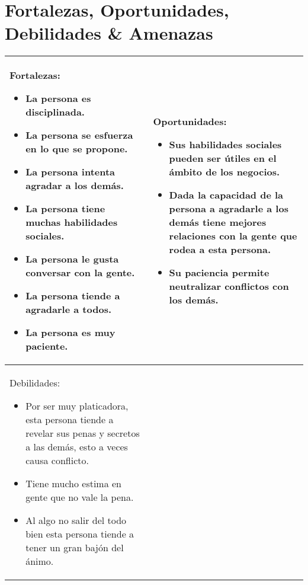 \documentclass{article}
\begin{document}
\maketitle


\section{Fortalezas, Oportunidades, Debilidades \& Amenazas}
\begin{center}
   \begin{tabular}{ | p{8.5cm} | p{8.5cm} | }
       \hline
            Fortalezas: 
                \begin{itemize}
                    \item La persona es disciplinada.
                    \item La persona se esfuerza en lo que se propone.
                    \item La persona intenta agradar a los demás.
                    \item La persona tiene muchas habilidades sociales.
                    \item La persona le gusta conversar con la gente.
                    \item La persona tiende a agradarle a todos.
                    \item La persona es muy paciente.
                \end{itemize}

            & Oportunidades: 
                \begin{itemize}
                    \item Sus habilidades sociales pueden ser útiles en el ámbito de los negocios.
                    \item Dada la capacidad de la persona a agradarle a los demás tiene mejores relaciones con la gente que rodea a esta persona.
                    \item Su paciencia permite neutralizar conflictos con los demás.
                \end{itemize}
            \\
        \hline
            Debilidades: 
                \begin{itemize}
                    \item Por ser muy platicadora, esta persona tiende a revelar sus penas y secretos a las demás, esto a veces causa conflicto.
                    \item Tiene mucho estima en gente que no vale la pena.
                    \item Al algo no salir del todo bien esta persona tiende a tener un gran bajón del ánimo.
                \end{itemize}
                

\end{tabular}
\end{center}
\end{document}
